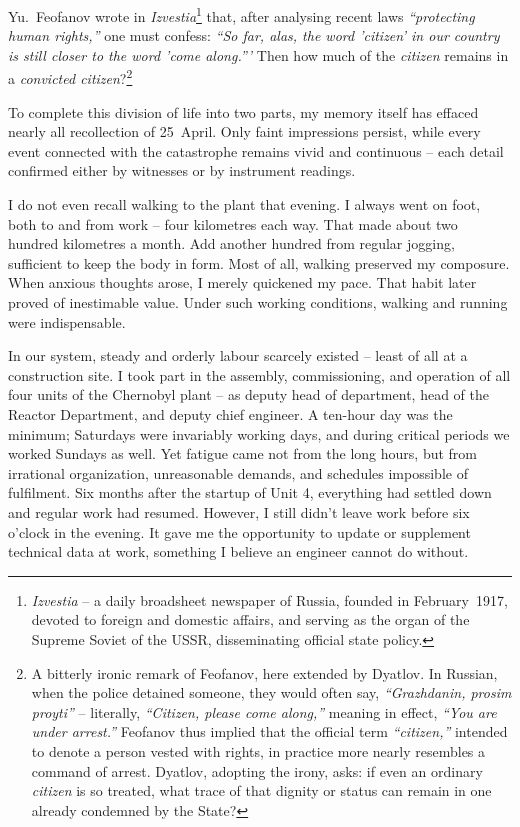 \documentclass[openright]{bookest}
\begin{document}
Yu.~Feofanov wrote in \textit{Izvestia}\footnote{\textit{Izvestia} -- a daily broadsheet newspaper of Russia, founded in February~1917, devoted to foreign and domestic affairs, and serving as the organ of the Supreme Soviet of the USSR, disseminating official state policy.} that, after analysing recent laws \textit{``protecting human rights,''} one must confess: \textit{``So far, alas, the word 'citizen' in our country is still closer to the word 'come along.'''} Then how much of the \textit{citizen} remains in a \textit{convicted citizen}?\footnote{A bitterly ironic remark of Feofanov, here extended by Dyatlov. In Russian, when the police detained someone, they would often say, \textit{``Grazhdanin, prosim proyti''} -- literally, \textit{``Citizen, please come along,''} meaning in effect, \textit{``You are under arrest.''} Feofanov thus implied that the official term \textit{``citizen,''} intended to denote a person vested with rights, in practice more nearly resembles a command of arrest. Dyatlov, adopting the irony, asks: if even an ordinary \textit{citizen} is so treated, what trace of that dignity or status can remain in one already condemned by the State?}


To complete this division of life into two parts, my memory itself has effaced nearly all recollection of 25~April. Only faint impressions persist, while every event connected with the catastrophe remains vivid and continuous -- each detail confirmed either by witnesses or by instrument readings.

I do not even recall walking to the plant that evening. I always went on foot, both to and from work -- four kilometres each way. That made about two hundred kilometres a month. Add another hundred from regular jogging, sufficient to keep the body in form. Most of all, walking preserved my composure. When anxious thoughts arose, I merely quickened my pace. That habit later proved of inestimable value. Under such working conditions, walking and running were indispensable.

In our system, steady and orderly labour scarcely existed -- least of all at a construction site. I took part in the assembly, commissioning, and operation of all four units of the Chernobyl plant -- as deputy head of department, head of the Reactor Department, and deputy chief engineer. A ten-hour day was the minimum; Saturdays were invariably working days, and during critical periods we worked Sundays as well. Yet fatigue came not from the long hours, but from irrational organization, unreasonable demands, and schedules impossible of fulfilment. Six months after the startup of Unit 4, everything had settled down and regular work had resumed. However, I still didn't leave work before six o'clock in the evening. It gave me the opportunity to update or supplement technical data at work, something I believe an engineer cannot do without.
\end{document}

